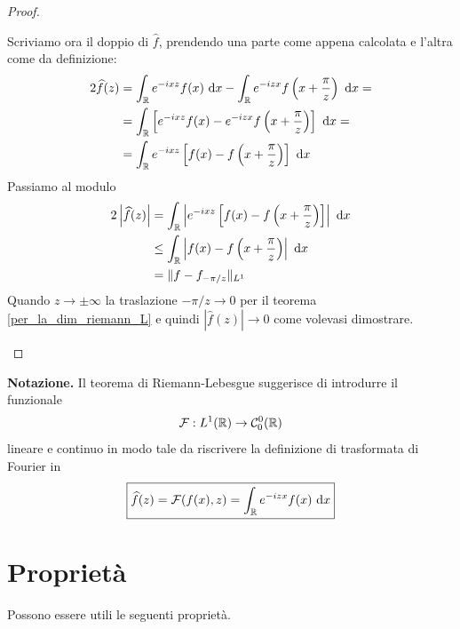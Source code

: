 \begin{proof}
\begin{enumerate}
    Scriviamo ora il doppio di $\hat{f}$, prendendo una parte come appena calcolata e l'altra come da definizione:
    \begin{align*}
    2\widehat{f}(z) & = \int_{\mathbb{R}} e^{- ixz} f(x) \  \mathrm{d} x - \int_{\mathbb{R}} e^{- izx} f\left(x + \frac{\pi}{z}\right) \  \mathrm{d} x=\\
     & = \int_{\mathbb{R}}\left[e^{- ixz} f(x) - e^{- izx} f\left(x + \frac{\pi}{z}\right)\right] \  \mathrm{d} x=\\
     & = \int_{\mathbb{R}} e^{- ixz}\left[f(x) - f\left(x + \frac{\pi}{z}\right)\right] \  \mathrm{d} x
    \end{align*}
    Passiamo al modulo
    \begin{align*}
    2\left| \widehat{f}(z)\right| & = \int_{\mathbb{R}}\left| e^{- ixz}\left[f(x) - f\left(x + \frac{\pi}{z}\right)\right]\right| \  \mathrm{d} x\\
     & \leq \int_{\mathbb{R}}\left| f(x) - f\left(x + \frac{\pi}{z}\right)\right| \  \mathrm{d} x\\
     & = \Vert f - f_{- \pi /z} \Vert_{L^{1}}
    \end{align*}
    Quando $z\rightarrow \pm \infty $ la traslazione $ - \pi /z\rightarrow 0$ per il teorema \ref{per_la_dim_riemann_L} e quindi $\left| \hat{f}(z)\right| \rightarrow 0$ come volevasi dimostrare.
\end{enumerate}
\end{proof}

\textbf{Notazione.} Il teorema di Riemann-Lebesgue suggerisce di introdurre il funzionale
\begin{equation*}
\mathcal{F} : L^{1}(\mathbb{R})\rightarrow \mathcal{C}^{0}_{0}(\mathbb{R})
\end{equation*}
lineare e continuo in modo tale da riscrivere la definizione di trasformata di Fourier in
\begin{equation*}
\boxed{\widehat{f}(z)=\mathcal{F}(f(x),z)=\int_{\mathbb{R}} e^{-izx}f(x)\  \mathrm{d} x}
\end{equation*}


\section{Proprietà}

Possono essere utili le seguenti proprietà.

